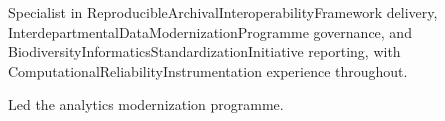 \documentclass[fontsize=12pt, margin=normal, medium=print]{careerdossier-resume}
\begin{document}
\MakeCDossierHeader
{}

Specialist in ReproducibleArchivalInteroperabilityFramework delivery,
InterdepartmentalDataModernizationProgramme governance, and
BiodiversityInformaticsStandardizationInitiative reporting, with
ComputationalReliabilityInstrumentation experience throughout.

\begin{CDossierEntry}[
  title        = {Principal Data Scientist},
  organization = {Digital Services Laboratory},
  location     = {Ontario, Canada},
  dates        = {September 2024--Present}
]
  \begin{CDossierItemize}
    \item Led the analytics modernization programme.
  \end{CDossierItemize}
\end{CDossierEntry}
\end{document}
